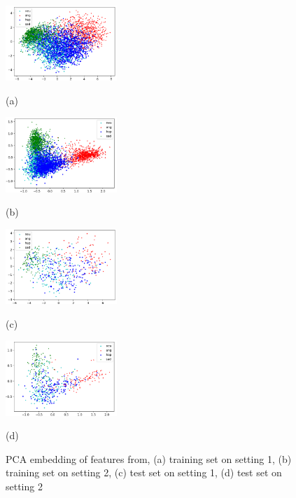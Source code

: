 \documentclass{article}
\begin{document}
\begin{figure}[htb]
	\begin{minipage}[b]{.48\linewidth}
		\centering
		\centerline{\includegraphics[width=4.2cm]{train_lambda0.png}}
		\centerline{\small(a)  }\medskip
	\end{minipage}
	\hfill
	\begin{minipage}[b]{0.48\linewidth}
		\centering
		\centerline{\includegraphics[width=4.2cm]{train_lambda03.png}}
		\centerline{\small(b)}\medskip
	\end{minipage}
	
	\begin{minipage}[b]{.48\linewidth}
		\centering
		\centerline{\includegraphics[width=4.2cm]{test_lambda0.png}}
		\centerline{\small(c)  }\medskip
	\end{minipage}
	\hfill
	\begin{minipage}[b]{0.48\linewidth}
		\centering
		\centerline{\includegraphics[width=4.2cm]{test_lambda03.png}}
		\centerline{\small(d)}\medskip
	\end{minipage}
	\caption{PCA embedding of features from, (a) training set on setting 1, (b) training set on setting 2, (c) test set on setting 1, (d) test set on setting 2}
	\label{fig:pca}
	\vspace{-10pt}
\end{figure}
\end{document}
